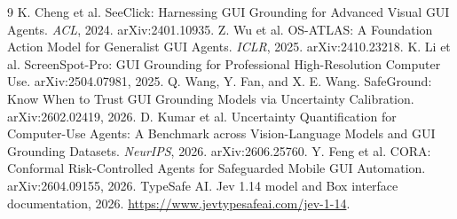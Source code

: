 \documentclass[10pt,twocolumn]{article}
\begin{document}
\balance
\begin{thebibliography}{9}
 K. Cheng et al. SeeClick: Harnessing GUI Grounding for Advanced Visual GUI Agents. \emph{ACL}, 2024. arXiv:2401.10935.
 Z. Wu et al. OS-ATLAS: A Foundation Action Model for Generalist GUI Agents. \emph{ICLR}, 2025. arXiv:2410.23218.
 K. Li et al. ScreenSpot-Pro: GUI Grounding for Professional High-Resolution Computer Use. arXiv:2504.07981, 2025.
 Q. Wang, Y. Fan, and X. E. Wang. SafeGround: Know When to Trust GUI Grounding Models via Uncertainty Calibration. arXiv:2602.02419, 2026.
 D. Kumar et al. Uncertainty Quantification for Computer-Use Agents: A Benchmark across Vision-Language Models and GUI Grounding Datasets. \emph{NeurIPS}, 2026. arXiv:2606.25760.
 Y. Feng et al. CORA: Conformal Risk-Controlled Agents for Safeguarded Mobile GUI Automation. arXiv:2604.09155, 2026.
 TypeSafe AI. Jev 1.14 model and Box interface documentation, 2026. \url{https://www.jevtypesafeai.com/jev-1-14}.
\end{thebibliography}
\end{document}
